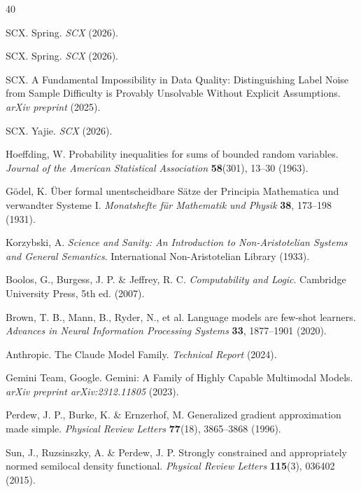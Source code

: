 \documentclass[12pt,a4paper]{article}
\theoremstyle{remark}
\begin{document}
\begin{thebibliography}{40}

SCX. Spring.
\textit{SCX} (2026).

SCX. Spring.
\textit{SCX} (2026).

SCX. A Fundamental Impossibility in Data Quality: Distinguishing Label Noise from 
Sample Difficulty is Provably Unsolvable Without Explicit Assumptions.
\textit{arXiv preprint} (2025).

SCX. Yajie.
\textit{SCX} (2026).

Hoeffding, W. Probability inequalities for sums of bounded random variables.
\textit{Journal of the American Statistical Association} \textbf{58}(301), 13--30 (1963).

G\"odel, K. \"Uber formal unentscheidbare S\"atze der Principia Mathematica und 
verwandter Systeme I.
\textit{Monatshefte f\"ur Mathematik und Physik} \textbf{38}, 173--198 (1931).

Korzybski, A. \textit{Science and Sanity: An Introduction to Non-Aristotelian Systems 
and General Semantics}. International Non-Aristotelian Library (1933).

Boolos, G., Burgess, J. P. \& Jeffrey, R. C. 
\textit{Computability and Logic}. Cambridge University Press, 5th ed. (2007).

Brown, T. B., Mann, B., Ryder, N., et al. Language models are few-shot learners.
\textit{Advances in Neural Information Processing Systems} \textbf{33}, 1877--1901 (2020).

Anthropic. The Claude Model Family. \textit{Technical Report} (2024).

Gemini Team, Google. Gemini: A Family of Highly Capable Multimodal Models.
\textit{arXiv preprint arXiv:2312.11805} (2023).

Perdew, J. P., Burke, K. \& Ernzerhof, M. Generalized gradient approximation made simple.
\textit{Physical Review Letters} \textbf{77}(18), 3865--3868 (1996).

Sun, J., Ruzsinszky, A. \& Perdew, J. P. Strongly constrained and appropriately normed 
semilocal density functional.
\textit{Physical Review Letters} \textbf{115}(3), 036402 (2015).


\end{thebibliography}
\end{document}
